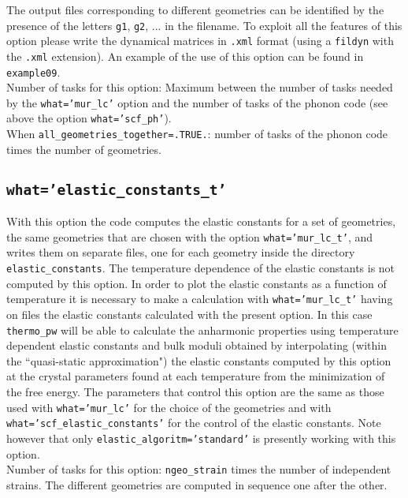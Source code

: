 \documentclass[12pt,a4paper]{article}
\begin{document}
The output files corresponding to different geometries can be identified
by the presence of the letters \texttt{g1}, \texttt{g2}, ... in the filename.
To exploit all the features of this option please write the dynamical matrices
in \texttt{.xml} format (using a \texttt{fildyn} with the \texttt{.xml}
extension).
An example of the use of this option can be found in \texttt{example09}. \\
Number of tasks for this option: Maximum between the number of tasks  
needed by the \texttt{what='mur\_lc'} option and the number
of tasks of the phonon code (see above the option \texttt{what='scf\_ph'}). \\
When \texttt{all\_geometries\_together=.TRUE.}: number of tasks of the
phonon code times the number of geometries. \\

\subsection{\color{web-blue}\texttt{what='elastic\_constants\_t'}}

With this option the code computes the elastic constants for a set of
geometries, the same geometries that are chosen with the option 
\texttt{what='mur\_lc\_t'}, and writes them on separate files, one for
each geometry inside the directory \texttt{elastic\_constants}. The 
temperature dependence of the elastic constants is
not computed by this option. In order to plot the elastic constants
as a function of temperature it is necessary to make a calculation
with \texttt{what='mur\_lc\_t'} having on files the elastic constants
calculated with the present option. In this case \texttt{thermo\_pw}
will be able to calculate the anharmonic properties using temperature
dependent elastic constants and bulk moduli obtained by interpolating 
(within the ``quasi-static approximation") the elastic constants computed 
by this option at the crystal parameters 
found at each temperature from the minimization of the free energy. 
The parameters that control this option are the same as those used with  
\texttt{what='mur\_lc'} for the choice of the geometries and with
\texttt{what='scf\_elastic\_constants'} for the control of the elastic
constants. Note however that only \texttt{elastic\_algoritm='standard'}
is presently working with this option. \\
Number of tasks for this option: \texttt{ngeo\_strain} times the number of
independent strains. The different geometries are computed in sequence one
after the other.
\end{document}
